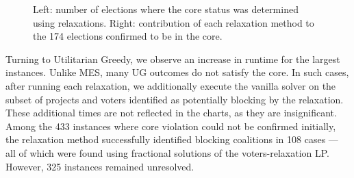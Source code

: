 \documentclass[magisterska,en]{pracamgr}
\begin{document}
\begin{figure}[h!]
    \begin{minipage}[c]{0.5\textwidth}
    \end{minipage}
    \begin{minipage}[c]{0.5\textwidth}
    \end{minipage}
    \caption{
        Left: number of elections where the core status was determined using relaxations.
        Right: contribution of each relaxation method to the 174 elections confirmed to be in the core.
    }
    \label{relaxations-mes}
\end{figure}

Turning to Utilitarian Greedy, we observe an increase in runtime for the largest instances. Unlike MES, many UG outcomes do not satisfy the core. In such cases, after running each relaxation, we additionally execute the vanilla solver on the subset of projects and voters identified as potentially blocking by the relaxation. These additional times are not reflected in the charts, as they are insignificant. Among the 433 instances where core violation could not be confirmed initially, the relaxation method successfully identified blocking coalitions in 108 cases --- all of which were found using fractional solutions of the voters-relaxation LP. However, 325 instances remained unresolved.
\end{document}
